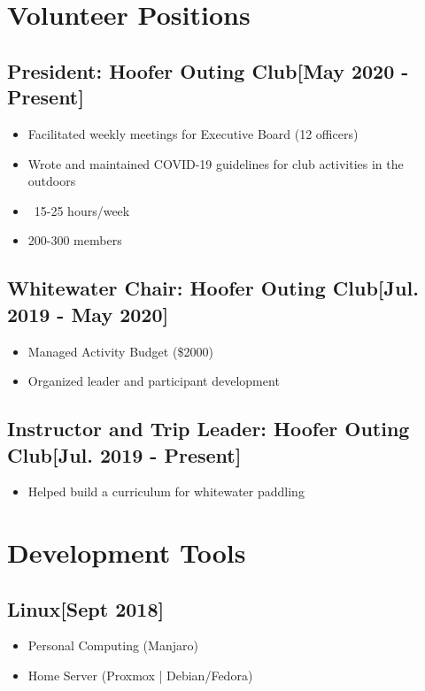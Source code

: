\documentclass{article}
\begin{document}

\section{Volunteer Positions}

    \subsection{\textbf{President}: Hoofer Outing Club\hfill[May 2020 - Present]}
        \begin{itemize}
            \item Facilitated weekly meetings for Executive Board (12 officers)
            \item Wrote and maintained COVID-19 guidelines for club activities in the outdoors
            \item ~15-25 hours/week
            \item 200-300 members
        \end{itemize}

    \subsection{\textbf{Whitewater Chair}: Hoofer Outing Club\hfill[Jul. 2019 - May 2020]}
        \begin{itemize}
            \item Managed Activity Budget (\$2000)
            \item Organized leader and participant development
        \end{itemize}

    \subsection{\textbf{Instructor and Trip Leader}: Hoofer Outing Club\hfill[Jul. 2019 - Present]}
        \begin{itemize}
            \item Helped build a curriculum for whitewater paddling
        \end{itemize}

\section{Development Tools}

    \subsection{\textbf{Linux}\hfill[Sept 2018]}
        \begin{itemize}
            \item Personal Computing (Manjaro)
            \item Home Server (Proxmox | Debian/Fedora)
        \end{itemize}
\end{document}
